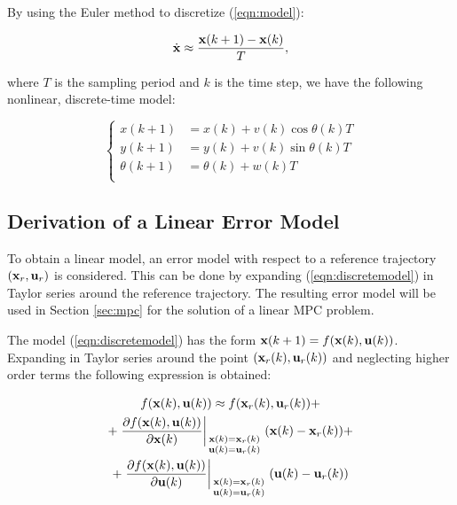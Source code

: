 \documentclass[conference]{IEEEtran} %
\begin{document}
By using the Euler method to discretize (\ref{eqn:model}):

\begin{equation*}
	\dot{\bf x} \approx \frac{{\bf x}(k+1)-{\bf x}(k)}{T},
\end{equation*}

\noindent where $T$ is the sampling period and $k$ is the time step, we have the following nonlinear, discrete-time model:

\begin{equation}
\label{eqn:discretemodel}
	\left\{
		\begin{aligned}
			x(k+1)	    &= x(k) + v(k)\cos\theta(k)T \\
			y(k+1)	    &= y(k) + v(k)\sin\theta(k)T \\
			\theta(k+1) &= \theta(k) + w(k)T \\
		\end{aligned}
	\right.
\end{equation} 

\subsection{Derivation of a Linear Error Model}

To obtain a linear model, an error model with respect to a reference trajectory $({\bf x}_r,{\bf u}_r)$ is considered. This can be done by expanding (\ref{eqn:discretemodel}) in Taylor series around the reference trajectory. The resulting error model will be used in Section \ref{sec:mpc} for the solution of a linear MPC problem.

The model (\ref{eqn:discretemodel}) has the form ${\bf x}(k+1)=f({\bf x}(k),{\bf u}(k))$. Expanding in Taylor series around the point $({\bf x}_r(k),{\bf u}_r(k))$ and neglecting higher order terms the following expression is obtained:

\begin{multline}
\label{eq:taylor}
	f({\bf x}(k),{\bf u}(k)) \approx f({\bf x}_r(k),{\bf u}_r(k)) + \\ + \left.\frac{\partial f({\bf x}(k),{\bf u}(k))}{\partial{\bf x}(k)}\right|_{\begin{smallmatrix}{\bf x}(k)={\bf x}_r(k) \\ {\bf u}(k)={\bf u}_r(k) \end{smallmatrix}}({\bf x}(k)-{\bf x}_r(k)) + \\ + \left.\frac{\partial f({\bf x}(k),{\bf u}(k))}{\partial{\bf u}(k)}\right|_{\begin{smallmatrix}{\bf x}(k)={\bf x}_r(k) \\ {\bf u}(k)={\bf u}_r(k) \end{smallmatrix}}({\bf u}(k)-{\bf u}_r(k))
\end{multline}
\end{document}
